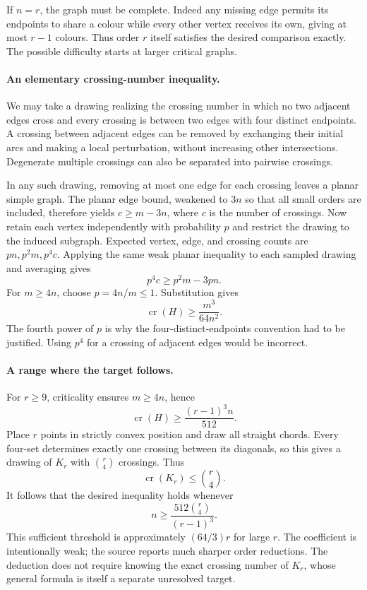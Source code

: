 \documentclass[11pt,a4paper]{article}
\begin{document}
If $n=r$, the graph must be complete. Indeed any missing edge permits its endpoints to share a colour while every other vertex receives its own, giving at most $r-1$ colours. Thus order $r$ itself satisfies the desired comparison exactly. The possible difficulty starts at larger critical graphs.

\paragraph{An elementary crossing-number inequality.}
We may take a drawing realizing the crossing number in which no two adjacent edges cross and every crossing is between two edges with four distinct endpoints. A crossing between adjacent edges can be removed by exchanging their initial arcs and making a local perturbation, without increasing other intersections. Degenerate multiple crossings can also be separated into pairwise crossings.

In any such drawing, removing at most one edge for each crossing leaves a planar simple graph. The planar edge bound, weakened to $3n$ so that all small orders are included, therefore yields $c\ge m-3n$, where $c$ is the number of crossings. Now retain each vertex independently with probability $p$ and restrict the drawing to the induced subgraph. Expected vertex, edge, and crossing counts are $pn,p^2m,p^4c$. Applying the same weak planar inequality to each sampled drawing and averaging gives
\[
p^4c\ge p^2m-3pn.
\]
For $m\ge4n$, choose $p=4n/m\le1$. Substitution gives
\[
\operatorname{cr}(H)\ge\frac{m^3}{64n^2}.
\]
The fourth power of $p$ is why the four-distinct-endpoints convention had to be justified. Using $p^4$ for a crossing of adjacent edges would be incorrect.

\paragraph{A range where the target follows.}
For $r\ge9$, criticality ensures $m\ge4n$, hence
\[
\operatorname{cr}(H)\ge\frac{(r-1)^3n}{512}.
\]
Place $r$ points in strictly convex position and draw all straight chords. Every four-set determines exactly one crossing between its diagonals, so this gives a drawing of $K_r$ with $\binom r4$ crossings. Thus
\[
\operatorname{cr}(K_r)\le\binom r4.
\]
It follows that the desired inequality holds whenever
\[
n\ge\frac{512\binom r4}{(r-1)^3}.
\]
This sufficient threshold is approximately $(64/3)r$ for large $r$. The coefficient is intentionally weak; the source reports much sharper order reductions. The deduction does not require knowing the exact crossing number of $K_r$, whose general formula is itself a separate unresolved target.
\end{document}
